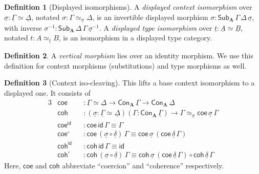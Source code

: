 \documentclass[12pt,a4paper,twoside,openany]{book}
\theoremstyle{remark}
\theoremstyle{definition}
\newtheorem{mydefinition}{Definition}
\theoremstyle{theorem}
\newcommand{\bs}[1]{\boldsymbol{#1}}
\newcommand{\id}{\mathsf{id}}
\newcommand{\Con}{\mathsf{Con}}
\newcommand{\Sub}{\mathsf{Sub}}
\newcommand{\ra}{\rightarrow}
\newcommand{\bA}{\bs{A}}
\newcommand{\ul}[1]{\underline{#1}}
\newcommand{\ulGamma}{\ul{\Gamma}}
\newcommand{\ulDelta}{\ul{\Delta}}
\newcommand{\uldelta}{\ul{\delta}}
\newcommand{\ulsigma}{\ul{\sigma}}
\newcommand{\ult}{\ul{t}}
\newcommand{\ulA}{\ul{A}}
\newcommand{\ulB}{\ul{B}}
\newcommand{\coe}{\mathsf{coe}}
\newcommand{\coh}{\mathsf{coh}}
\begin{document}
\begin{mydefinition}[Displayed isomorphisms]
\label{def:displayed-iso}
A \emph{displayed context isomorphism} over $\ulsigma : \ulGamma \simeq
\ulDelta$, notated $\sigma : \Gamma \simeq_{\ulsigma} \Delta$, is an invertible
displayed morphism $\sigma : \Sub_{\bA}\,\Gamma\,\Delta\,\ulsigma$, with inverse
$\sigma^{-1} : \Sub_{\bA}\,\Delta\,\Gamma\,\ulsigma^{-1}$. A \emph{displayed
  type isomorphism} over $\ult : \ulA \simeq \ulB$, notated $t : A \simeq_{\ult}
B$, is an isomorphism in a displayed type category.
\end{mydefinition}

\begin{mydefinition}
A \emph{vertical morphism} lies over an identity morphism. We use this
definition for context morphisms (substitutions) and type morphisms as well.
\end{mydefinition}

\begin{mydefinition}[Context iso-cleaving] This lifts a base context isomorphism to a displayed one. It consists of
\begin{alignat*}{3}
  & \coe &&: \ulGamma \simeq \ulDelta \ra \Con_{\bA}\,\ulGamma \ra \Con_{\bA}\,\ulDelta\\
  & \coh &&: (\ulsigma : \ulGamma \simeq \ulDelta)(\Gamma : \Con_{\bA}\,\ulGamma)
           \ra \Gamma \simeq_{\ulsigma} \coe\,\ulsigma\,\Gamma\\
  & \coe^{\id} && : \coe\,\id\,\Gamma \equiv \Gamma\\
  & \coe^{\circ} && : \coe\,(\ulsigma\circ\uldelta)\,\Gamma \equiv \coe\,\ulsigma\,(\coe\,\uldelta\,\Gamma)\\
  & \coh^{\id} && : \coh\,\id\,\Gamma \equiv \id\\
  & \coh^{\circ} && : \coh\,(\ulsigma\circ\uldelta)\,\Gamma \equiv \coh\,\ulsigma\,(\coe\,\uldelta\,\Gamma)
          \circ \coh\,\uldelta\,\Gamma
\end{alignat*}
Here, $\coe$ and $\coh$ abbreviate ``coercion'' and ``coherence'' respectively.
\end{mydefinition}
\end{document}
